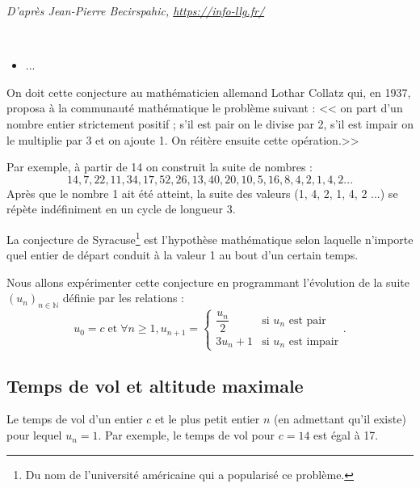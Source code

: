 
\begin{flushright}
\textit{D'après Jean-Pierre Becirspahic, \url{https://info-llg.fr/}}
\end{flushright}
\begin{obj} ~\\
\begin{itemize}
\item ...
\end{itemize}
\end{obj}


On doit cette conjecture au mathématicien allemand Lothar Collatz qui, en 1937, proposa à la communauté mathématique
le problème suivant : << on part d’un nombre entier strictement positif ; s’il est pair on le divise par 2, s’il est impair on le multiplie par 3 et on ajoute 1. On réitère ensuite cette opération.>>

Par exemple, à partir de 14 on construit la suite de nombres :
$$14 ,7 ,22 ,11 ,34, 17, 52, 26, 13, 40, 20, 10, 5, 16, 8, 4, 2, 1, 4, 2 ...$$
Après que le nombre 1 ait été atteint, la suite des valeurs (1, 4, 2, 1, 4, 2 ...) se répète indéfiniment en un cycle de
longueur 3.

La conjecture de Syracuse\footnote{Du nom de l’université américaine qui a popularisé ce problème.} est l’hypothèse mathématique selon laquelle n’importe quel entier de départ conduit à la valeur 1 au bout d’un certain temps.

Nous allons expérimenter cette conjecture en programmant l’évolution de la suite $\left(u_n\right)_{n\in \mathbb{N}}$ définie par les relations :
$$
u_0=c \;\text{et} \; \forall n\geq 1, u_{n+1}=\left\{
\begin{array}{ll} 
\dfrac{u_n}{2} & \text{si }u_n \text{ est pair}\\
3 u_n + 1  & \text{si }u_n \text{ est impair}
\end{array} \right. .
$$

\subsection*{Temps de vol et altitude maximale}
Le temps de vol d’un entier $c$ et le plus petit entier $n$ (en admettant qu’il existe) pour lequel $u_n = 1$. Par exemple, le temps de vol pour $c = 14$ est égal à 17.


